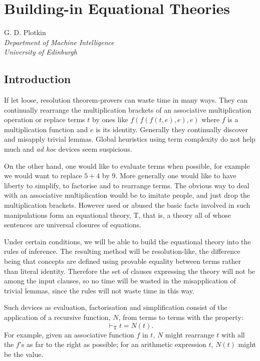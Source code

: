\documentclass[letterpaper]{report}
\title{}
\author{}
\begin{document}


\section*{Building-in Equational
	Theories}\label{chapter-building-in-equational-theories}

G. D. Plotkin\\
\emph{Department of Machine Intelligence}\\
\emph{University of Edinburgh}

\subsection*{Introduction}\label{introduction}

If let loose, resolution theorem-provers can waste time in many ways.
They can continually rearrange the multiplication brackets of an
associative multiplication operation or replace terms $t$ by ones like
$f(f(f(t,e),e),e)$ where $f$ is a multiplication function and $e$
is its identity. Generally they continually discover and misapply
trivial lemmas. Global heuristics using term complexity do not help much
and \emph{ad hoc} devices seem suspicious.

On the other hand, one would like to evaluate terms when possible, for
example we would want to replace $5+4$ by $9$. More generally one
would like to have liberty to simplify, to factorise and to rearrange
terms. The obvious way to deal with an associative multiplication would
be to imitate people, and just drop the multiplication brackets. However
used or abused the basic facts involved in such manipulations form an
equational theory, $\mathrm{T}$, that is, a theory all of whose sentences are
universal closures of equations.

Under certain conditions, we will be able to build the equational theory
into the rules of inference. The resulting method will be
resolution-like, the difference being that concepts are defined using
provable equality between terms rather than literal identity. Therefore
the set of clauses expressing the theory will not be among the input
clauses, so no time will be wasted in the misapplication of trivial
lemmas, since the rules will not waste time in this way.

Such devices as evaluation, factorisation and simplification consist of
the application of a recursive function, $N$, from terms to terms with
the property:
\[
\vdash_{\mathrm{T}}t=N(t).
\]
For example, given an associative function $f$ in $t$, $N$ might
rearrange $t$ with all the $f$'s as far to the right
as possible; for an arithmetic expression $t$, $N(t)$ might be the
value.
\end{document}
